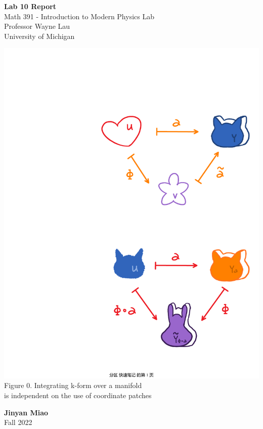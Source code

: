 \documentclass[11pt]{book}
\theoremstyle{break}
\theoremstyle{break}
\begin{document}
	\begin{titlepage}
		\begin{center}
			\vspace*{1cm}
			\Huge \color{red}
				\textbf{Lab 10 Report}\\
			\vspace{0.5cm}			
			\Large \color{black}
				Math 391 - Introduction to Modern Physics Lab\\
				Professor Wayne Lau\\	
				University of Michigan\\
			\vspace{3cm}

			\includegraphics[scale=0.6]{Intkform1.pdf}\\
			\hfill\break
			\color{gray}Figure 0. Integrating k-form over a manifold\\is independent on the use of coordinate patches\color{black}
			
			
			
			\vspace{5cm}
			\LARGE
				\textbf{Jinyan Miao}\\
				\hfill\break
				\LARGE Fall 2022\\
			\vspace{1cm}

		\vspace*{\fill}
		\end{center}			
	\end{titlepage}
\end{document}
